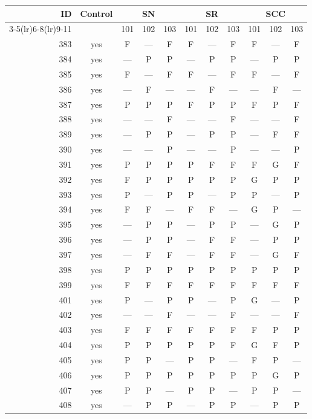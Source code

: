 \begin{table}[p]\centering\small
\begin{tabular*}{\textwidth}{@{\extracolsep{\fill}}rc*{9}{c}@{}}\toprule
ID & Control & \multicolumn{3}{c}{SN} & \multicolumn{3}{c}{SR} & \multicolumn{3}{c}{SCC}\\
\cmidrule(lr){3-5}\cmidrule(lr){6-8}\cmidrule(lr){9-11}
 & & 101 & 102 & 103 & 101 & 102 & 103 & 101 & 102 & 103\\\midrule
383 & yes & F & — & F & F & — & F & F & — & F\\
384 & yes & — & P & P & — & P & P & — & P & P\\
385 & yes & F & — & F & F & — & F & F & — & F\\
386 & yes & — & F & — & — & F & — & — & F & —\\
387 & yes & P & P & P & F & P & P & F & P & F\\
388 & yes & — & — & F & — & — & F & — & — & F\\
389 & yes & — & P & P & — & P & P & — & F & F\\
390 & yes & — & — & P & — & — & P & — & — & P\\
391 & yes & P & P & P & P & F & F & F & G & F\\
392 & yes & F & P & P & P & P & P & G & P & P\\
393 & yes & P & — & P & P & — & P & P & — & P\\
394 & yes & F & F & — & F & F & — & G & P & —\\
395 & yes & — & P & P & — & P & P & — & G & P\\
396 & yes & — & P & P & — & F & F & — & P & P\\
397 & yes & — & F & F & — & F & F & — & G & F\\
398 & yes & P & P & P & P & P & P & P & P & P\\
399 & yes & F & F & F & F & F & F & F & F & F\\
401 & yes & P & — & P & P & — & P & G & — & P\\
402 & yes & — & — & F & — & — & F & — & — & F\\
403 & yes & F & F & F & F & F & F & F & P & P\\
404 & yes & P & P & P & P & P & F & G & F & P\\
405 & yes & P & P & — & P & P & — & F & P & —\\
406 & yes & P & P & P & P & P & P & P & G & P\\
407 & yes & P & P & — & P & P & — & P & P & —\\
408 & yes & — & P & P & — & P & P & — & P & P\\

\end{tabular*}
\end{table}
